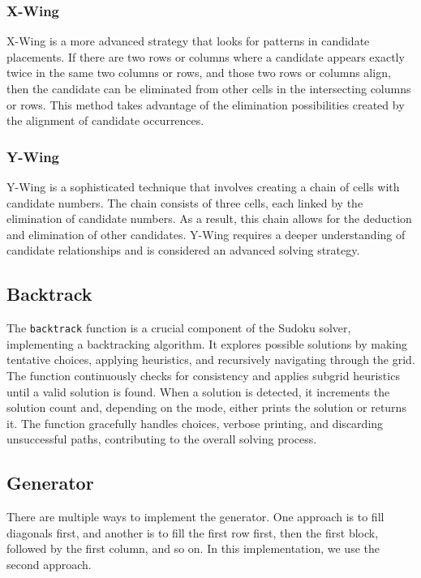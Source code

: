 \documentclass[a4paper, 11pt]{article}
\begin{document}
\subsubsection{X-Wing}
X-Wing is a more advanced strategy that looks for patterns in candidate placements. If there are two rows or columns where a candidate appears exactly twice in the same two columns or rows, and those two rows or columns align, then the candidate can be eliminated from other cells in the intersecting columns or rows. This method takes advantage of the elimination possibilities created by the alignment of candidate occurrences.

\subsubsection{Y-Wing}
Y-Wing is a sophisticated technique that involves creating a chain of cells with candidate numbers. The chain consists of three cells, each linked by the elimination of candidate numbers. As a result, this chain allows for the deduction and elimination of other candidates. Y-Wing requires a deeper understanding of candidate relationships and is considered an advanced solving strategy.



\subsection{Backtrack}
The \texttt{backtrack} function is a crucial component of the Sudoku solver, implementing a backtracking algorithm. It explores possible solutions by making tentative choices, applying heuristics, and recursively navigating through the grid. The function continuously checks for consistency and applies subgrid heuristics until a valid solution is found. When a solution is detected, it increments the solution count and, depending on the mode, either prints the solution or returns it. The function gracefully handles choices, verbose printing, and discarding unsuccessful paths, contributing to the overall solving process.



\subsection{Generator}
There are multiple ways to implement the generator. One approach is to fill diagonals first, and another is to fill the first row first, then the first block, followed by the first column, and so on. In this implementation, we use the second approach.
\end{document}
